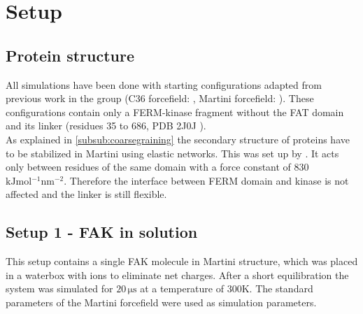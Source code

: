 \chapter{Setup}
\section{Protein structure}
All simulations have been done with starting configurations adapted from previous work in the group (C36 forcefield: \textcite{pap003}, Martini forcefield: \textcite{sara}). These configurations contain only a FERM-kinase fragment without the FAT domain and its linker (residues 35 to 686, PDB 2J0J \autocite{structFAK}).\\
As explained in \autoref{subsub:coarsegraining} the secondary structure of proteins have to be stabilized in Martini using elastic networks. This was set up by \textcite{sara}. It acts only between residues of the same domain with a force constant of 830 $\si{\kilo\joule\mole^{-1}\nano\meter^{-2}}$. Therefore the interface between FERM domain and kinase is not affected and the linker is still flexible.
\section{Setup 1 - FAK in solution}
\label{setup:setup1}
This setup contains a single FAK molecule in Martini structure, which was placed in a waterbox with ions to eliminate net charges. After a short equilibration the system was simulated for $20\,\si{\micro\second}$ at a temperature of $300\si{\kelvin}$. The standard parameters of the Martini forcefield were used as simulation parameters.
